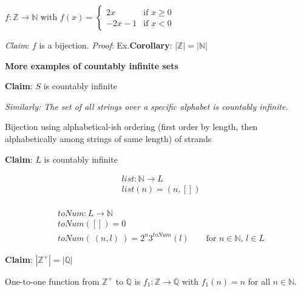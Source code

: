 \documentclass[12pt, oneside]{article}
\begin{document}
$f: \mathbb{Z} \to \mathbb{N}$ with $f(x) = \begin{cases}2x &\text{if $x \geq 0$} \\-2x-1 &\text{if $x < 0$} \end{cases}$

{\it Claim}: $f$ is a bijection.  {\it Proof}: Ex.\hfill {\bf Corollary}: $ | \mathbb{Z} | = |\mathbb{N}|$
\newpage


 

{\bf More examples of countably infinite sets}

{\bf Claim}: $S$ is countably infinite

{\it Similarly: The set of all strings over a specific alphabet is countably infinite.}
\begin{center}
Bijection using alphabetical-ish ordering
(first order by length, then alphabetically among strings of same length) 
of strands
\end{center}

\vspace{50pt}


{\bf Claim}: $L$ is countably infinite

\begin{multicols}{2}
\begin{align*}
    &list: \mathbb{N} \to L \\
    &list(n) = (n, []) \\
    &
\end{align*}

\begin{align*}
    &toNum: L \to \mathbb{N} \\
    &toNum([]) = 0 \\
    &toNum( ~(n,l)~) = 2^n 3^{toNum}(l) \qquad \text{for $n \in \mathbb{N}$, $l \in L$}
\end{align*}
\end{multicols}
\vspace{30pt}

{\bf Claim}: $|\mathbb{Z}^+| = |\mathbb{Q}|$ 

One-to-one function from $\mathbb{Z}^+$ to $\mathbb{Q}$
is $f_1: \mathbb{Z} \to \mathbb{Q}$ with $f_1(n) = n$ for all 
$n \in \mathbb{N}$.

\vspace{30pt}
\end{document}
